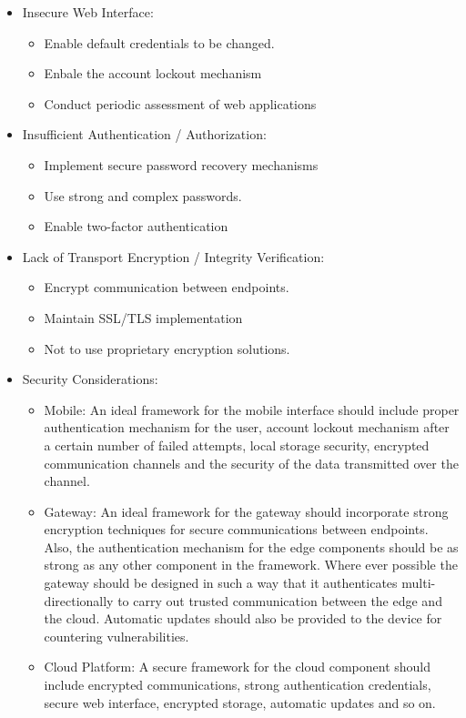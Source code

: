 \begin{itemize}
    \item Insecure Web Interface:
    \begin{itemize}
        \item Enable default credentials to be changed.
        \item Enbale the account lockout mechanism
        \item Conduct periodic assessment of web applications
    \end{itemize}
    \item Insufficient Authentication / Authorization:
    \begin{itemize}
        \item Implement secure password recovery mechanisms
        \item Use strong and complex passwords.
        \item Enable two-factor authentication
    \end{itemize}
    \item Lack of Transport Encryption / Integrity Verification:
    \begin{itemize}
        \item Encrypt communication between endpoints.
        \item Maintain SSL/TLS implementation
        \item Not to use proprietary encryption solutions.
    \end{itemize}
    \item Security Considerations:
    \begin{itemize}
        \item Mobile: An ideal framework for the mobile interface should include proper authentication mechanism for the user, account lockout mechanism after a certain number of failed attempts, local storage security, encrypted communication channels and the security of the data transmitted over the channel.
        \item Gateway: An ideal framework for the gateway should incorporate strong encryption techniques for secure communications between endpoints. Also, the authentication mechanism for the edge components should be as strong as any other component in the framework. Where ever possible the gateway should be designed in such a way that it authenticates multi-directionally to carry out trusted communication between the edge and the cloud. Automatic updates should also be provided to the device for countering vulnerabilities.
        \item Cloud Platform: A secure framework for the cloud component should include encrypted communications, strong authentication credentials, secure web interface, encrypted storage, automatic updates and so on.

\end{itemize}
\end{itemize}

